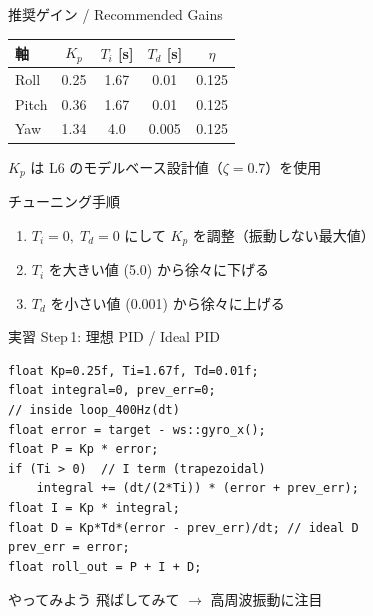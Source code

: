 \documentclass[aspectratio=169, 14pt]{beamer}
\begin{document}
\begin{frame}{推奨ゲイン / Recommended Gains}
  \begin{table}
    \centering
    \begin{tabular}{lcccc}
      \hline
      \textbf{軸} & \textbf{$K_p$} & \textbf{$T_i$ [s]} & \textbf{$T_d$ [s]} & \textbf{$\eta$} \\
      \hline
      Roll  & 0.25 & 1.67 & 0.01  & 0.125 \\
      Pitch & 0.36 & 1.67 & 0.01  & 0.125 \\
      Yaw   & 1.34 & 4.0  & 0.005 & 0.125 \\
      \hline
    \end{tabular}
  \end{table}

  \vspace{0.3em}

  {\small $K_p$ は L6 のモデルベース設計値（$\zeta = 0.7$）を使用}

  \vspace{0.3em}

  \begin{block}{チューニング手順}
    \begin{enumerate}
      \item $T_i{=}0,\; T_d{=}0$ にして $K_p$ を調整（振動しない最大値）
      \item $T_i$ を大きい値 (5.0) から徐々に下げる
      \item $T_d$ を小さい値 (0.001) から徐々に上げる
    \end{enumerate}
  \end{block}
\end{frame}

\begin{frame}[fragile]{実習 Step\,1: 理想 PID / Ideal PID}
  \begin{lstlisting}[style=sfcpp, title={user\_code.cpp (roll axis excerpt)}]
float Kp=0.25f, Ti=1.67f, Td=0.01f;
float integral=0, prev_err=0;
// inside loop_400Hz(dt)
float error = target - ws::gyro_x();
float P = Kp * error;
if (Ti > 0)  // I term (trapezoidal)
    integral += (dt/(2*Ti)) * (error + prev_err);
float I = Kp * integral;
float D = Kp*Td*(error - prev_err)/dt; // ideal D
prev_err = error;
float roll_out = P + I + D;
  \end{lstlisting}

  \begin{exampleblock}{やってみよう}
    飛ばしてみて $\to$ 高周波振動に注目
  \end{exampleblock}
\end{frame}
\end{document}
